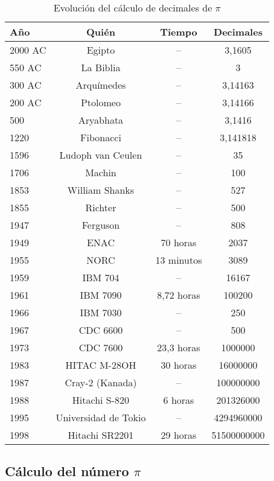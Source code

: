 \documentclass[spanish,a4paper,10pt]{article}
\begin{document}
\begin{table}[!ht]
\begin{center}
\begin{tabular}{|l||c|c|c|} 
\hline
Año & Quién & Tiempo & Decimales\\ \hline
2000 AC & Egipto & -- & 3,1605 \\ \hline
550 AC & La Biblia & -- & 3 \\ \hline
300 AC & Arquímedes & -- & 3,14163 \\ \hline
200 AC & Ptolomeo & -- & 3,14166 \\ \hline
500 & Aryabhata & -- & 3,1416 \\ \hline
1220 & Fibonacci & -- & 3,141818 \\ \hline
1596 & Ludoph van Ceulen & -- & 35 \\ \hline
1706 & Machin & -- & 100 \\ \hline
1853 & William Shanks & -- & 527 \\ \hline
1855 & Richter & -- & 500 \\ \hline
1947 & Ferguson & -- & 808 \\ \hline
1949 & ENAC & 70 horas & 2037 \\ \hline
1955 & NORC & 13 minutos & 3089 \\ \hline
1959 & IBM 704 & -- & 16167 \\ \hline
1961 & IBM 7090 & 8,72 horas & 100200 \\ \hline
1966 & IBM 7030 & -- & 250 \\ \hline
1967 & CDC 6600 & -- & 500 \\ \hline
1973 & CDC 7600 & 23,3 horas & 1000000 \\ \hline
1983 & HITAC M-28OH & 30 horas & 16000000 \\ \hline
1987 & Cray-2 (Kanada) & -- & 100000000 \\ \hline
1988 & Hitachi S-820 & 6 horas & 201326000 \\ \hline
1995 & Universidad de Tokio & -- & 4294960000 \\ \hline
1998 & Hitachi SR2201 & 29 horas & 51500000000 \\ \hline
\end{tabular}
\end{center}
\caption{Evolución del cálculo de decimales de $\pi$}
\label{tab}
\end{table}

\subsection{Cálculo del número $\pi$}
\end{document}

